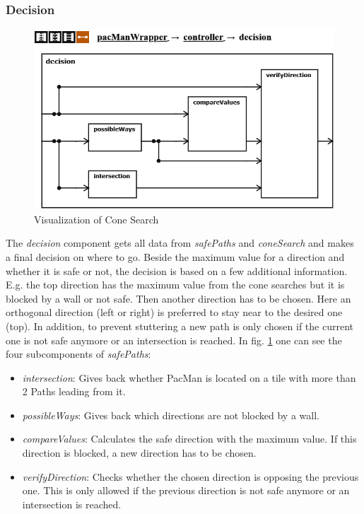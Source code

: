 \subsubsection{Decision}
\begin{figure}
	\label{fig:decision}
	\centering
	\includegraphics[scale=0.55]{pictures/PacMan/Decision.png}
	\caption{Visualization of Cone Search}
\end{figure}
The \textit{decision} component gets all data from \textit{safePaths} and \textit{coneSearch} and makes a final decision on where to go. Beside the maximum value for a direction and whether it is safe or not, the decision is based on a few additional information. E.g. the top direction has the maximum value from the cone searches but it is blocked by a wall or not safe. Then another direction has to be chosen. Here an orthogonal direction (left or right) is preferred to stay near to the desired one (top). In addition, to prevent stuttering a new path is only chosen if the current one is not safe anymore or an intersection is reached.
In fig. \ref{fig:decision} one can see the four subcomponents of \textit{safePaths}:
\begin{itemize}
	\item \textit{intersection}: Gives back whether PacMan is located on a tile with more than 2 Paths leading from it.
	\item \textit{possibleWays}: Gives back which directions are not blocked by a wall.
	\item \textit{compareValues}: Calculates the safe direction with the maximum value. If this direction is blocked, a new direction has to be chosen.
	\item \textit{verifyDirection}: Checks whether the chosen direction is opposing the previous one. This is only allowed if the previous direction is not safe anymore or an intersection is reached.
\end{itemize}